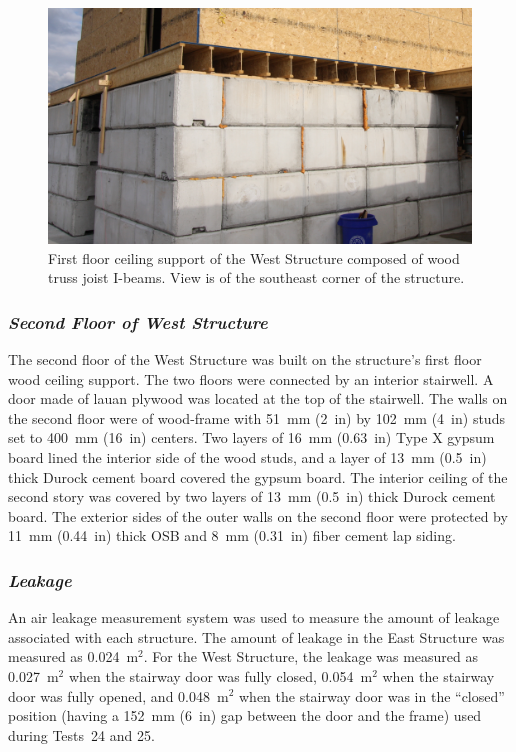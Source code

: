 \begin{figure}[!h]
	\centering
	\includegraphics[width=6in]{Figures/Pictures/TJI_support}
	\caption[Ceiling support of the West Structure]{First floor ceiling support of the West Structure composed of wood truss joist I-beams. View is of the southeast corner of the structure.}
	\label{fig:TJI}
\end{figure}

\subsubsection*{\textit{Second Floor of West Structure}}
The second floor of the West Structure was built on the structure's first floor wood ceiling support. The two floors were connected by an interior stairwell. A door made of lauan plywood was located at the top of the stairwell. The walls on the second floor were of wood-frame with 51~mm (2~in) by 102~mm (4~in) studs set to 400~mm (16~in) centers. Two layers of 16~mm (0.63~in) Type X gypsum board lined the interior side of the wood studs, and a layer of 13~mm (0.5~in) thick Durock cement board covered the gypsum board. The interior ceiling of the second story was covered by two layers of 13~mm (0.5~in) thick Durock cement board. The exterior sides of the outer walls on the second floor were protected by 11~mm (0.44~in) thick OSB and 8~mm (0.31~in) fiber cement lap siding.

\subsubsection*{\textit{Leakage}}

An air leakage measurement system was used to measure the amount of leakage associated with each structure. The amount of leakage in the East Structure was measured as 0.024~m$^2$. For the West Structure, the leakage was measured as 0.027~m$^2$ when the stairway door was fully closed, 0.054~m$^2$ when the stairway door was fully opened, and 0.048~m$^2$ when the stairway door was in the ``closed'' position (having a 152~mm (6~in) gap between the door and the frame) used during Tests~24 and 25.

